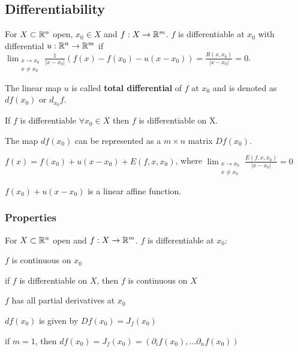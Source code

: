 \subsection{Differentiability}
For $X \subset \mathbb{R}^n$ open, $x_0 \in X$ and $f: X \to \mathbb{R}^m$. $f$ is differentiable at $x_0$ with differential $u: \mathbb{R}^n \to \mathbb{R}^m$ if $\lim_{\substack{x \to x_0\\ x \neq  x_0}} \frac{1}{|x - x_0|}(f(x) - f(x_0) - u(x - x_0)) = \frac{R(x, x_0)}{|x - x_0|} = 0$.
\begin{compactitem}
    \item The linear map $u$ is called \textbf{total differential} of $f$ at $x_0$ and is denoted as $df(x_0)$ or $d_{x_0}f$.
    \item If $f$ is differentiable $\forall x_0 \in X$ then $f$ is differentiable on X.
    \item The map $df(x_0)$ can be represented as a $m \times n$ matrix $Df(x_0)$.
    \item $f(x) = f(x_0) + u(x - x_0) + E(f, x, x_0)$, where $\lim_{\substack{x \to x_0 \\ x \neq x_0}} \frac{E(f, x, x_0)}{|x - x_0|} = 0$
        \begin{compactitem}
            \item $f(x_0) + u(x - x_0)$ is a linear affine function.
        \end{compactitem}
\end{compactitem}

\subsubsection{Properties}
For $X \subset \mathbb{R}^n$ open and $f: X \to \mathbb{R}^m$. $f$ is differentiable at $x_0$:
\begin{compactitem}
    \item $f$ is continuous on $x_0$
        \begin{compactitem}
            \item if $f$ is differentiable on $X$, then $f$ is continuous on $X$
        \end{compactitem}
    \item $f$ has all partial derivatives at $x_0$
    \item $df(x_0)$ is given by $Df(x_0) = J_f(x_0)$
        \begin{compactitem}
            \item if $m = 1$, then $df(x_0) = J_f(x_0) = (\partial_i f(x_0), \dots \partial_n f(x_0))$
        \end{compactitem}
\end{compactitem}

